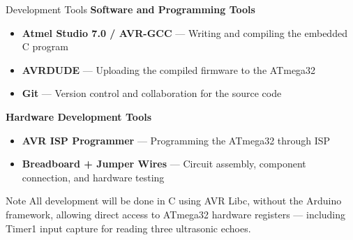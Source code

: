 \documentclass[aspectratio=169,11pt]{beamer}
\newcommand{\highlight}[1]{\textcolor{teal!80!black}{\textbf{#1}}}
\begin{document}
\begin{frame}{Development Tools}
    \scriptsize
    \textbf{Software and Programming Tools}
    \begin{itemize}\setlength{\itemsep}{0pt}
        \item \highlight{Atmel Studio 7.0 / AVR-GCC} --- Writing and compiling the embedded C program
        \item \highlight{AVRDUDE} --- Uploading the compiled firmware to the ATmega32
        \item \highlight{Git} --- Version control and collaboration for the source code
    \end{itemize}

    \vspace{0.12cm}
    \textbf{Hardware Development Tools}
    \begin{itemize}\setlength{\itemsep}{0pt}
        \item \highlight{AVR ISP Programmer} --- Programming the ATmega32 through ISP
        \item \highlight{Breadboard + Jumper Wires} --- Circuit assembly, component connection, and hardware testing
    \end{itemize}

    \vspace{0.12cm}
    \begin{alertblock}{Note}
        \scriptsize All development will be done in C using AVR Libc, without the Arduino framework, allowing direct access to ATmega32 hardware registers --- including Timer1 input capture for reading three ultrasonic echoes.
    \end{alertblock}
\end{frame}

\end{document}
